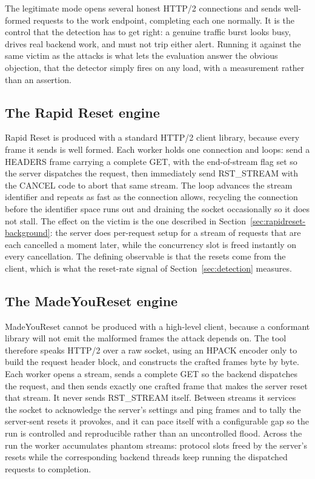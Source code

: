 \documentclass[a4paper,fleqn]{cas-dc}
\begin{document}
The legitimate mode opens several honest HTTP/2 connections and sends well-formed requests to the work endpoint, completing each one normally. It is the control that the detection has to get right: a genuine traffic burst looks busy, drives real backend work, and must not trip either alert. Running it against the same victim as the attacks is what lets the evaluation answer the obvious objection, that the detector simply fires on any load, with a measurement rather than an assertion.

\subsection{The Rapid Reset engine}\label{sec:rapidreset-engine}

Rapid Reset is produced with a standard HTTP/2 client library, because every frame it sends is well formed. Each worker holds one connection and loops: send a HEADERS frame carrying a complete GET, with the end-of-stream flag set so the server dispatches the request, then immediately send RST\_STREAM with the CANCEL code to abort that same stream. The loop advances the stream identifier and repeats as fast as the connection allows, recycling the connection before the identifier space runs out and draining the socket occasionally so it does not stall. The effect on the victim is the one described in Section~\ref{sec:rapidreset-background}: the server does per-request setup for a stream of requests that are each cancelled a moment later, while the concurrency slot is freed instantly on every cancellation. The defining observable is that the resets come from the client, which is what the reset-rate signal of Section~\ref{sec:detection} measures.

\subsection{The MadeYouReset engine}\label{sec:madeyoureset-engine}

MadeYouReset cannot be produced with a high-level client, because a conformant library will not emit the malformed frames the attack depends on. The tool therefore speaks HTTP/2 over a raw socket, using an HPACK encoder only to build the request header block, and constructs the crafted frames byte by byte. Each worker opens a stream, sends a complete GET so the backend dispatches the request, and then sends exactly one crafted frame that makes the server reset that stream. It never sends RST\_STREAM itself. Between streams it services the socket to acknowledge the server's settings and ping frames and to tally the server-sent resets it provokes, and it can pace itself with a configurable gap so the run is controlled and reproducible rather than an uncontrolled flood. Across the run the worker accumulates phantom streams: protocol slots freed by the server's resets while the corresponding backend threads keep running the dispatched requests to completion.
\end{document}
